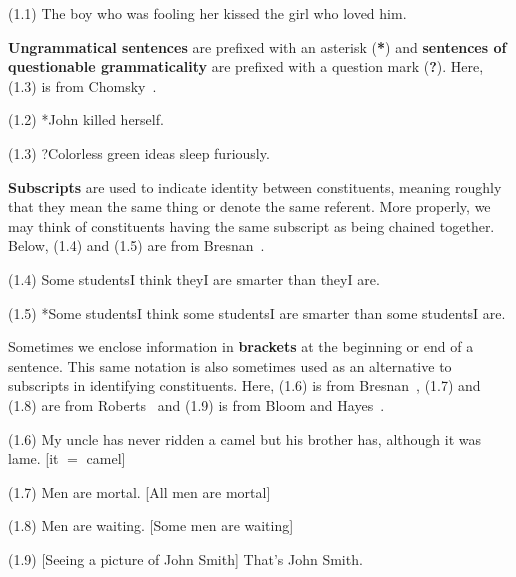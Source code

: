\documentclass{article}
\begin{document}
\begin{enumerate*}
\item[(1.1)] The boy who was fooling her kissed the girl who
loved him.
\end{enumerate*}

\textbf{Ungrammatical sentences} are prefixed with an asterisk
(\textbf{*}) and
\textbf{sentences of questionable grammaticality} are prefixed
with a question mark (\textbf{?}). Here, (1.3) is from
Chomsky~\cite{Chomsky57}.

\begin{enumerate*}
\item[(1.2)] *John killed herself.
\item[(1.3)] ?Colorless green ideas sleep furiously.
\end{enumerate*}

\textbf{Subscripts} are used to indicate identity between
constituents, meaning roughly that they mean the same thing or
denote the same referent. More properly, we may think of
constituents having the same subscript as being chained
together. Below, (1.4) and (1.5) are from
Bresnan~\cite{Bresnan71}.

\begin{enumerate*}
\item[(1.4)] Some studentsI think theyI are smarter than theyI
are.
\item[(1.5)] *Some studentsI think some studentsI are smarter
than some studentsI are.
\end{enumerate*}

Sometimes we enclose information in \textbf{brackets} at the
beginning or end of a sentence. This same notation is also
sometimes used as an alternative to subscripts in identifying
constituents. Here, (1.6) is from Bresnan~\cite{Bresnan71},
(1.7) and (1.8) are from Roberts~\cite{Roberts67} and (1.9) is
from Bloom and Hayes~\cite{BloomHayes78}.

\begin{enumerate*}
\item[(1.6)] My uncle has never ridden a camel but his brother
has, although it was lame. [it ${=}$ camel]
\item[(1.7)] Men are mortal. [All men are mortal]
\item[(1.8)] Men are waiting. [Some men are waiting]
\item[(1.9)] [Seeing a picture of John Smith] That's John Smith.
\end{enumerate*}
\end{document}
